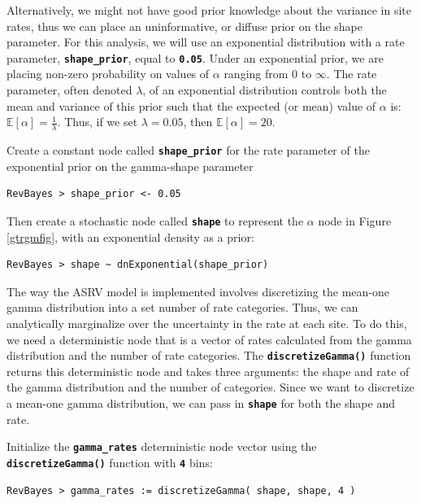 \documentclass[11pt]{article}
\newcommand{\cl}[1]{{\texttt{\textbf{#1}}}}
\begin{document}
Alternatively, we might not have good prior knowledge about the variance in site rates, thus we can place an uninformative, or diffuse prior on the shape parameter.
For this analysis, we will use an exponential distribution with a rate parameter, \cl{shape\_prior}, equal to \cl{0.05}.
Under an exponential prior, we are placing non-zero probability on values of $\alpha$ ranging from 0 to $\infty$. 
The rate parameter, often denoted $\lambda$, of an exponential distribution controls both the mean and variance of this prior such that the expected (or mean) value of $\alpha$ is:
$\mathbb{E}[\alpha] = \frac{1}{\lambda}.$
Thus, if we set $\lambda=0.05$, then $\mathbb{E}[\alpha] = 20$.

Create a constant node called \cl{shape\_prior} for the rate parameter of the exponential prior on the gamma-shape parameter
{\tt\begin{snugshade*}
\begin{lstlisting}
RevBayes > shape_prior <- 0.05                                                                             
\end{lstlisting}
\end{snugshade*}}

Then create a stochastic node called \cl{shape} to represent the $\alpha$ node in Figure \ref{gtrgmfig}, with an exponential density as a prior:
{\tt\begin{snugshade*}
\begin{lstlisting}
RevBayes > shape ~ dnExponential(shape_prior)

\end{lstlisting}
\end{snugshade*}}

The way the ASRV model is implemented involves discretizing the mean-one gamma distribution into a set number of rate categories. Thus, we can analytically marginalize over the uncertainty in the rate at each site. To do this, we need a deterministic node that is a vector of rates calculated from the gamma distribution and the number of rate categories. The \cl{discretizeGamma()} function returns this deterministic node and takes three arguments: the shape and rate of the gamma distribution and the number of categories. Since we want to discretize a mean-one gamma distribution, we can pass in \cl{shape} for both the shape and rate.

Initialize the \cl{gamma\_rates} deterministic node vector using the  \cl{discretizeGamma()} function with \cl{4} bins:
{\tt \begin{snugshade*}
\begin{lstlisting}
RevBayes > gamma_rates := discretizeGamma( shape, shape, 4 )
\end{lstlisting}
\end{snugshade*}}
\end{document}
